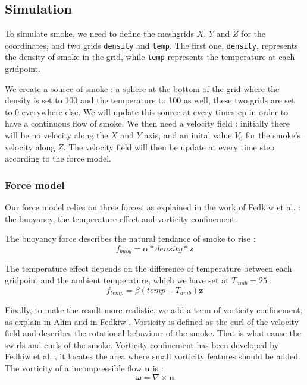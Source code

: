 \documentclass[accepted,single]{gipaper}
\begin{document}



\subsection{Simulation}
To simulate smoke, we need to define the meshgrids $X$, $Y$ and $Z$ for the coordinates, and two grids \verb+density+ and \verb+temp+. The first one, \verb+density+, represents the density of smoke in the grid, while  \verb+temp+ represents the temperature at each gridpoint.

We create a source of smoke : a sphere at the bottom of the grid where the density is set to 100 and the temperature to 100 as well, these two grids are set to 0 everywhere else. We will update this source at every timestep in order to have a continuous flow of smoke.
We then need a velocity field : initially there will be no velocity along the $X$ and $Y$ axis, and an inital value $V_0$ for the smoke's velocity along $Z$. 
The velocity field will then be update at every time step according to the force model.

\subsubsection{Force model}
 Our force model relies on three forces, as explained in the work of Fedkiw et al. \cite{Fedkiw:2001} : the buoyancy, the temperature effect and vorticity confinement.

The buoyancy force describes the natural tendance of smoke to rise : 
$$ f_{buoy} = \alpha * density * \mathbf{z}$$

The temperature effect depends on the difference of temperature between each gridpoint and the ambient temperature, which we have set at $T_{amb} = 25$ : 
$$f_{temp} = \beta(temp-T_{amb})\mathbf{z}$$

Finally, to make the result more realistic, we add a term of vorticity confinement, as explain in Alim and in Fedkiw \cite{alim:ms,Fedkiw:2001}.
Vorticity is defined  as the curl of the velocity field and describes the rotational behaviour of the smoke. That is what cause the swirls and curls of the smoke.
Vorticity confinement has been developed by Fedkiw et al. \cite{Fedkiw:2001}, it locates the area where small vorticity features should be added.
The vorticity of a incompressible flow $\mathbf{u}$ is :
$$\mathbf{\omega} = \nabla \times \mathbf{u}$$
\end{document}

